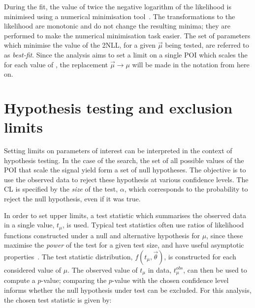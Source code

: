 During the fit, the value of twice the negative logarithm of the likelihood is minimised using a numerical minimisation tool~\cite{RooFit}. The transformations to the likelihood are monotonic and do not change the resulting minima; they are performed to make the numerical minimisation task easier. The set of parameters which minimise the value of the 2NLL, for a given $\vec{\mu}$ being tested, are referred to as \textit{best-fit}. 
Since the \Hee analysis aims to set a limit on a single POI which scales the \BHee for each value of \mH, the replacement $\vec{\mu}\rightarrow\mu$ will be made in the notation from here on.



\section{Hypothesis testing and exclusion limits}
Setting limits on parameters of interest can be interpreted in the context of hypothesis testing. In the case of the \Hee search, the set of all possible values of the POI that scale the signal yield form a set of null hypotheses. The objective is to use the observed data to reject these hypothesis at various confidence levels. The CL is specified by the \textit{size} of the test, $\alpha$, which corresponds to the probability to reject the null hypothesis, even if it was true. 

In order to set upper limits, a test statistic which summarises the observed data in a single value, $t_{\mu}$, is used. Typical test statistics often use ratios of likelihood functions constructed under a null and alternative hypothesis for $\mu$, since these maximise the \textit{power} of the test for a given test size, and have useful asymptotic properties~\cite{Cowan,NeymanPearson}. The test statistic distribution, $f(t_{\mu},\vec{\theta})$, is constructed for each considered value of $\mu$. The observed value of $t_{\mu}$ in data, $t_{\mu}^{obs}$, can then be used to compute a $p$-value; comparing the $p$-value with the chosen confidence level informs whether the null hypothesis under test can be excluded. For this analysis, the chosen test statistic is given by:

